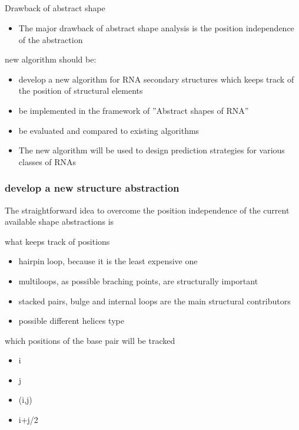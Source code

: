 \documentclass[ignorenonframetext,10pt]{beamer}
\begin{document}
\subsection{}
\begin{frame}
\frametitle{}
   \begin{block}{\small Drawback of abstract shape}
   \begin{itemize} 
   \item The major drawback of abstract shape analysis is the position
   independence of the abstraction
   \end{itemize}
   \end{block}
   \begin{block}{\small new algorithm should be:}
   \begin{itemize}
     \item develop a new algorithm for RNA secondary structures which keeps
     track of the position of structural elements
     \item be implemented in the framework of ''Abstract shapes of RNA''
     \item be evaluated and compared to existing algorithms
     \item The new algorithm will be used to design prediction strategies for
     various classes of RNAs
   \end{itemize} 
   \end{block}
\end{frame}


\begin{frame}
\frametitle{develop a new structure abstraction}
    The straightforward idea to overcome the position independence of the
    current available shape abstractions is
    \begin{block}{what keeps track of positions}
    \begin{itemize} 
    \item hairpin loop, because it is the least expensive one
    \item multiloops, as possible braching points, are structurally important    
    \item stacked pairs, bulge and internal loops are the main structural
    contributors 
    \item possible different helices type
    \end{itemize}
    \end{block}
    \begin{block}{which positions of the base pair will be tracked}
    \begin{itemize} 
    \item i
    \item j   
    \item (i,j)
    \item i+j/2
    \end{itemize}    
    \end{block}
\end{frame}
\end{document}
